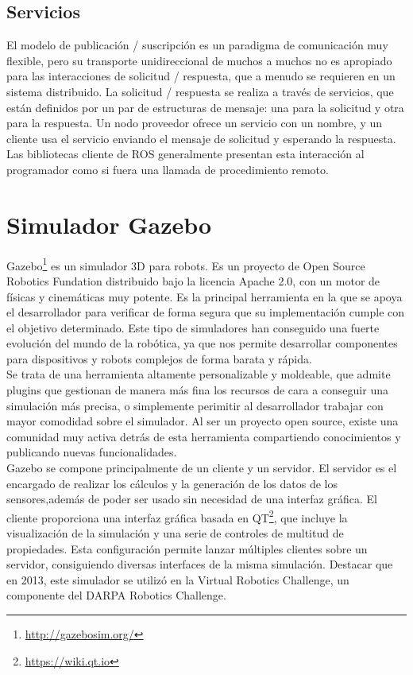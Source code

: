 \subsection{Servicios}
El modelo de publicación / suscripción es un paradigma de comunicación muy flexible, pero su transporte unidireccional de muchos a muchos no es apropiado para las interacciones de solicitud / respuesta, que a menudo se requieren en un sistema distribuido. La solicitud / respuesta se realiza a través de servicios, que están definidos por un par de estructuras de mensaje: una para la solicitud y otra para la respuesta. Un nodo proveedor ofrece un servicio con un nombre, y un cliente usa el servicio enviando el mensaje de solicitud y esperando la respuesta. Las bibliotecas cliente de ROS generalmente presentan esta interacción al programador como si fuera una llamada de procedimiento remoto.\\

\section{Simulador Gazebo}
\label{sec:gazebo}
Gazebo\footnote{\url{http://gazebosim.org/}} es un simulador 3D para robots. Es un proyecto de Open Source Robotics Fundation distribuido bajo la licencia Apache 2.0, con un motor de físicas y cinemáticas muy potente. Es la principal herramienta en la que se apoya el desarrollador para verificar de forma segura que su implementación cumple con el objetivo determinado. Este tipo de simuladores han conseguido una fuerte evolución del mundo de la robótica, ya que nos permite desarrollar componentes para dispositivos y robots complejos de forma barata y rápida.\\

Se trata de una herramienta altamente personalizable y moldeable, que admite plugins que gestionan de manera más fina los recursos de cara a conseguir una simulación más precisa, o simplemente perimitir al desarrollador trabajar con mayor comodidad sobre el simulador.
Al ser un proyecto open source, existe una comunidad muy activa detrás de esta herramienta compartiendo conocimientos y publicando nuevas funcionalidades.\\

Gazebo se compone principalmente de un cliente y un servidor. El servidor es el encargado de realizar los cálculos y la generación de los datos de los sensores,además de poder ser usado sin necesidad de una interfaz gráfica.
El cliente proporciona una interfaz gráfica basada en QT\footnote{\url{https://wiki.qt.io}}, que incluye la visualización de la simulación y una serie de controles de multitud de propiedades. Esta configuración permite lanzar múltiples clientes sobre un servidor, consiguiendo diversas interfaces de la misma simulación.
Destacar que en 2013, este simulador se utilizó en la Virtual Robotics Challenge, un componente del DARPA Robotics Challenge. \\

